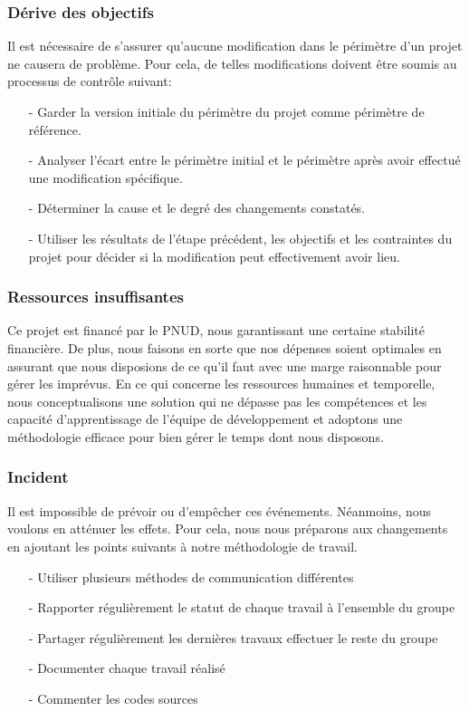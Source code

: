 		\subsubsection{D\'erive des objectifs\cite{DeriveDesObjectifs}}
			 Il est n\'ecessaire de s'assurer qu'aucune modification dans le p\'erim\`etre d'un projet ne causera de probl\`eme. Pour cela, de telles modifications doivent \^etre soumis au processus de contr\^ole suivant:
				\begin{itemize}
					\item[-] Garder la version initiale du p\'erim\`etre du projet comme p\'erim\`etre de r\'ef\'erence.
					\item[-] Analyser l'\'ecart entre le p\'erim\`etre initial et le p\'erim\`etre apr\`es avoir effectu\'e une modification sp\'ecifique.
					\item[-] D\'eterminer la cause et le degr\'e des changements constat\'es.
					\item[-] Utiliser les r\'esultats de l'\'etape pr\'ec\'edent, les objectifs et les contraintes du projet pour d\'ecider si la modification peut effectivement avoir lieu.\\
				\end{itemize}

			\subsubsection{Ressources insuffisantes}
				Ce projet est financ\'e par le PNUD, nous garantissant une certaine stabilit\'e financi\`ere. De plus, nous faisons en sorte que nos d\'epenses soient optimales en assurant que nous disposions de ce qu'il faut avec une marge raisonnable pour g\'erer les impr\'evus. En ce qui concerne les ressources humaines et temporelle, nous conceptualisons une solution qui ne d\'epasse pas les comp\'etences et les capacit\'e d'apprentissage de l'\'equipe de d\'eveloppement et adoptons une m\'ethodologie efficace pour bien g\'erer le temps dont nous disposons.

			\subsubsection{Incident}
				Il est impossible de pr\'evoir ou d'emp\^echer ces \'ev\'enements. N\'eanmoins, nous voulons en att\'enuer les effets\cite{RessourcesInsuffisantes2}. Pour cela, nous nous pr\'eparons aux changements en ajoutant les points suivants \`a notre m\'ethodologie de travail.
				\begin{itemize}
					\item[-] Utiliser plusieurs m\'ethodes de communication diff\'erentes
					\item[-] Rapporter r\'eguli\`erement le statut de chaque travail \`a l'ensemble du groupe
					\item[-] Partager r\'eguli\`erement les derni\`eres travaux effectuer le reste du groupe
					\item[-] Documenter chaque travail r\'ealis\'e
					\item[-] Commenter les codes sources\\
				\end{itemize}

